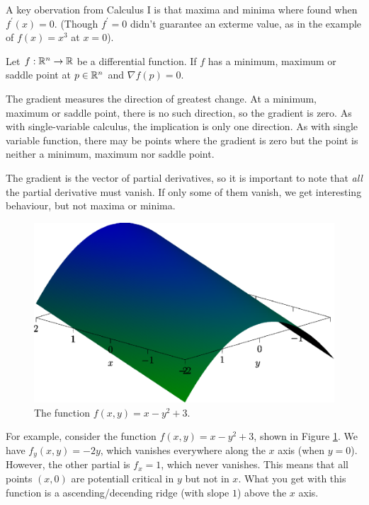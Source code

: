\documentclass[fleqn,letterpaper]{report}
\begin{document}
A key obervation from Calculus I is that maxima and minima
where found when $f^\prime(x) = 0$. (Though $f^\prime =0$
didn't guarantee an exterme value, as in the example of $f(x)
= x^3$ at $x=0$). 

\begin{prop}
Let $f: \mathbb{R}^n \rightarrow \mathbb{R}$ be a differential function.
If $f$ has a minimum, maximum or saddle point at $p \in
\mathbb{R}^n$ and $\nabla f (p) = 0$.
\end{prop}

The gradient measures the direction of greatest change. At a
minimum, maximum or saddle point, there is no such direction,
so the gradient is zero. As with single-variable calculus, the
implication is only one direction. As with single variable
function, there may be points where the gradient is zero but
the point is neither a minimum, maximum nor saddle point.

The gradient is the vector of partial derivatives, so it is
important to note that \emph{all} the partial derivative must
vanish. If only some of them vanish, we get interesting
behaviour, but not maxima or minima. 

\begin{figure}[t]
\centering
\includegraphics[width=12cm]{figure43.eps}
\caption{The function $f(x,y) = x-y^2+3$.}
\label{figure-3d-graph5}
\end{figure}

\begin{example}
For example, consider the function $f(x,y) = x-y^2+3$, shown in
Figure \ref{figure-3d-graph5}. We have $f_y(x,y) = -2y$, which
vanishes everywhere along the $x$ axis (when $y=0$). However,
the other partial is $f_x = 1$, which never vanishes. This
means that all points $(x,0)$ are potentiall critical in $y$
but not in $x$. What you get with this function is a
ascending/decending ridge (with slope $1$) above the $x$ axis.
\end{example}
\end{document}
